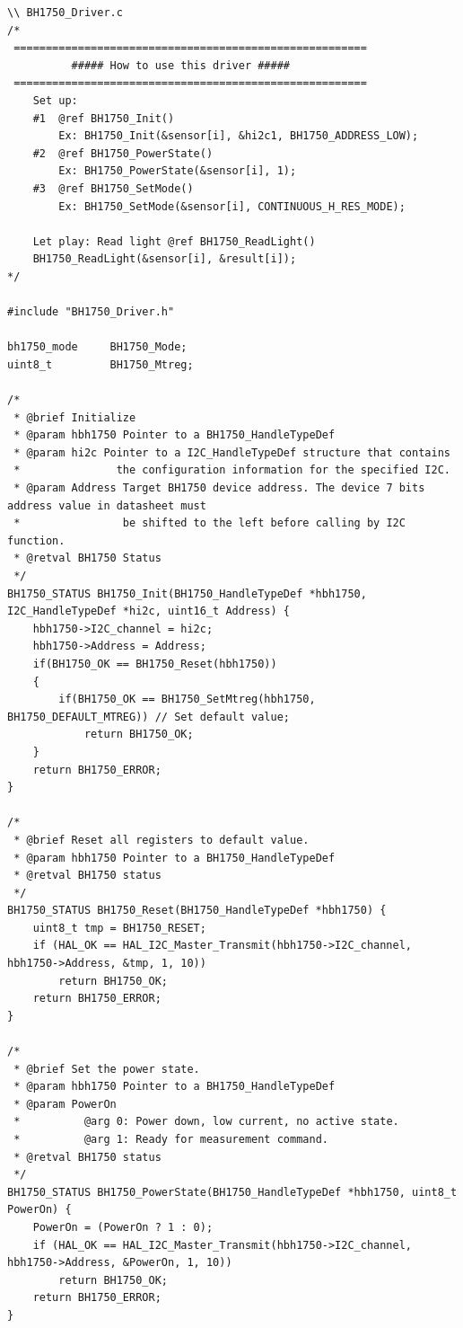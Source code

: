 \begin{lstlisting}
\\ BH1750_Driver.c
/*
 =======================================================
          ##### How to use this driver #####
 =======================================================
    Set up:
    #1  @ref BH1750_Init()
        Ex: BH1750_Init(&sensor[i], &hi2c1, BH1750_ADDRESS_LOW);
    #2  @ref BH1750_PowerState()
        Ex: BH1750_PowerState(&sensor[i], 1);
    #3  @ref BH1750_SetMode()
        Ex: BH1750_SetMode(&sensor[i], CONTINUOUS_H_RES_MODE);
        
    Let play: Read light @ref BH1750_ReadLight()
    BH1750_ReadLight(&sensor[i], &result[i]);
*/

#include "BH1750_Driver.h"

bh1750_mode     BH1750_Mode;
uint8_t         BH1750_Mtreg;

/*
 * @brief Initialize
 * @param hbh1750 Pointer to a BH1750_HandleTypeDef
 * @param hi2c Pointer to a I2C_HandleTypeDef structure that contains
 *               the configuration information for the specified I2C.
 * @param Address Target BH1750 device address. The device 7 bits address value in datasheet must
 *                be shifted to the left before calling by I2C function.
 * @retval BH1750 Status
 */
BH1750_STATUS BH1750_Init(BH1750_HandleTypeDef *hbh1750, I2C_HandleTypeDef *hi2c, uint16_t Address) {
    hbh1750->I2C_channel = hi2c;
    hbh1750->Address = Address;
    if(BH1750_OK == BH1750_Reset(hbh1750))
    {
        if(BH1750_OK == BH1750_SetMtreg(hbh1750, BH1750_DEFAULT_MTREG)) // Set default value;
            return BH1750_OK;
    }
    return BH1750_ERROR;
}

/* 
 * @brief Reset all registers to default value.
 * @param hbh1750 Pointer to a BH1750_HandleTypeDef
 * @retval BH1750 status
 */
BH1750_STATUS BH1750_Reset(BH1750_HandleTypeDef *hbh1750) {
    uint8_t tmp = BH1750_RESET;
    if (HAL_OK == HAL_I2C_Master_Transmit(hbh1750->I2C_channel, hbh1750->Address, &tmp, 1, 10))
        return BH1750_OK;
    return BH1750_ERROR;
}

/*
 * @brief Set the power state.
 * @param hbh1750 Pointer to a BH1750_HandleTypeDef
 * @param PowerOn
 *          @arg 0: Power down, low current, no active state.
 *          @arg 1: Ready for measurement command. 
 * @retval BH1750 status
 */
BH1750_STATUS BH1750_PowerState(BH1750_HandleTypeDef *hbh1750, uint8_t PowerOn) {
    PowerOn = (PowerOn ? 1 : 0);
    if (HAL_OK == HAL_I2C_Master_Transmit(hbh1750->I2C_channel, hbh1750->Address, &PowerOn, 1, 10))
        return BH1750_OK;
    return BH1750_ERROR;
}


\end{lstlisting}
